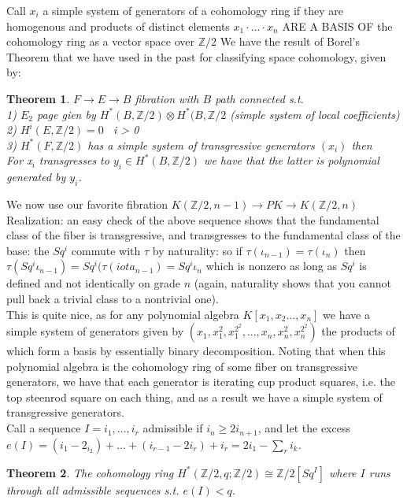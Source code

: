 \documentclass{article}
\newcommand{\bb}[1]{\mathbb{#1}}
\newtheorem{theorem}{Theorem}
\newcommand{\bb}[1]{\mathbb{#1}}
\begin{document}
Call $x_{i}$ a simple system of generators of a cohomology ring if they are homogenous and products of distinct elements $x_{1} \cdot ... \cdot x_{n}$ ARE A BASIS OF the cohomology ring as a vector space over $\bb{Z}/2$
We have the result of Borel's Theorem that we have used in the past for classifying space cohomology, given by:

\begin{theorem}
  $F\to E \to B$ fibration with $B$ path connected s.t. \\
  1) $E_{2}$ page gien by $H^{*}(B, \bb{Z}/2) \otimes H^{*}(B, \bb{Z}/2$ (simple system of local coefficients) \\
  2) $H^{i}(E, \bb{Z}/2) = 0$ \forall \ i > 0 \\
  3) $H^{*}(F, \mathbb{Z}/2)$ has a simple system of transgressive generators $(x_{i})$ then \\
  For x$_{i}$ transgresses to $y_{i} \in H^{*}(B, \bb{Z}/2)$ we have that the latter is polynomial generated by $y_{i}$. 
\end{theorem}

We now use our favorite fibration $K(\bb{Z}/2,n-1) \to PK \to K(\bb{Z}/2, n)$ \\

Realization: an easy check of the above sequence shows that the fundamental class of the fiber is transgressive, and transgresses to the fundamental class of the base: the $Sq^{i}$ commute with $\tau$ by naturality: so if $\tau(\iota_{n-1}) = \tau(\iota_{n})$ then $\tau(Sq^{i}\iota_{n-1}) = Sq^{i}(\tau(iota_{n-1}) = Sq^{i}\iota_{n}$ which is nonzero as long as $Sq^{i}$ is defined and not identically on grade $n$ (again, naturality shows that you cannot pull back a trivial class to a nontrivial one). \\

This is quite nice, as for any polynomial algebra $K[x_{1},x_{2}...,x_{n}]$ we have a simple system of generators given by $(x_{1}, x_{1}^{2}, x_{1}^{2^{2}},...,x_{n}, x_{n}^{2}, x_{n}^{2^{2}})$ the products of which form a basis by essentially binary decomposition. Noting that when this polynomial algebra is the cohomology ring of some fiber on transgressive generators, we have that each generator is iterating cup product squares, i.e. the top steenrod square on each thing, and as a result we have a simple system of transgressive generators. \\

Call a sequence $I = i_{1},...,i_{r}$ admissible if $i_{n} \geq 2i_{n+1}$, and let the excess $e(I) = (i_{1} - 2_{i_{2}}) + ... + (i_{r-1} - 2i_{r}) + i_{r} = 2i_{1} - \sum_{r}i_{k}$.   
\begin{theorem}
  The cohomology ring $H^{*}(\mathbb{Z}/2, q; \mathbb{Z}/2) \cong \bb{Z}/2[Sq^{I}]$ where $I$ runs through all admissible sequences s.t. $e(I) < q$.
\end{theorem}
\\
\end{document}
